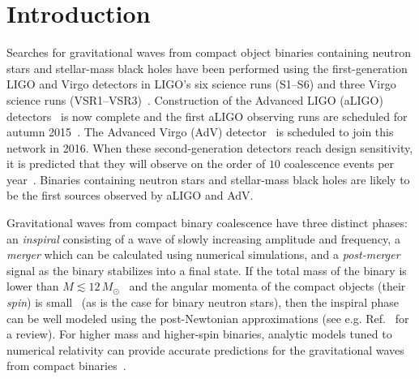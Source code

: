 \section{Introduction}

Searches for gravitational waves from compact object
binaries containing neutron stars and stellar-mass black holes have been
performed using the first-generation LIGO and Virgo detectors in LIGO's six
science runs (S1--S6) and three Virgo science runs
(VSR1--VSR3)~\cite{Abbott:2003pj,Abbott:2005pe,Abbott:2005kq,Abbott:2007xi,Abbott:2007ai,Abbott:2009tt,Abbott:2009qj,Abadie:2010yba,Abadie:2011nz}.
Construction of the Advanced LIGO (aLIGO) detectors~\cite{TheLIGOScientific:2014jea} is now complete and the
first aLIGO observing runs are scheduled for autumn 2015~\cite{Aasi:2013wya}.
The Advanced Virgo (AdV) detector~\cite{Acernese:2015gua} is scheduled to join this network in 2016.
When these second-generation detectors reach design sensitivity, it is
predicted that they will observe on the order of $10$ coalescence events per
year~\cite{Abadie:2010cf}. Binaries containing neutron stars and stellar-mass
black holes are likely to be the first sources observed by aLIGO and AdV. 

Gravitational waves from compact binary coalescence have three distinct
phases: an \emph{inspiral} consisting of a wave of slowly increasing amplitude
and frequency, a \emph{merger} which can be calculated using numerical
simulations, and a \emph{post-merger} signal as the binary stabilizes into a final
state. If the total mass of the binary is lower than $M \lesssim 12\,
M_\odot$~\cite{Buonanno:2009zt,Brown:2012nn}
and the angular momenta of the compact objects (their \emph{spin}) is
small~\cite{Nitz:2013mxa,Kumar:2015tha}
(as is the case for binary neutron stars), then the inspiral phase can be 
well modeled using the post-Newtonian approximations (see e.g.
Ref.~\cite{Blanchet:2013haa} for a review).  For higher mass and higher-spin
binaries, analytic models tuned to numerical relativity can provide accurate
predictions for the gravitational waves from compact 
binaries~\cite{Buonanno:1998gg,Pan:2009wj,Damour:2012ky,Taracchini:2013rva,Damour:2014sva}. 

